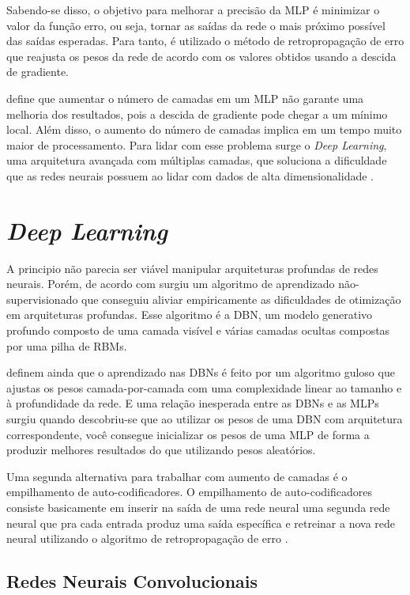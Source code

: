 Sabendo-se disso, o objetivo para melhorar a precisão da \ac{MLP} é minimizar o valor da função erro, ou seja, tornar as saídas da rede o mais próximo possível das saídas esperadas. Para tanto, é utilizado o método de retropropagação de erro que reajusta os pesos da rede de acordo com os valores obtidos usando a descida de gradiente.

 define que aumentar o número de camadas em um \ac{MLP} não garante uma melhoria dos resultados, pois a descida de gradiente pode chegar a um mínimo local. Além disso, o aumento do número de camadas implica em um tempo muito maior de processamento. Para lidar com esse problema surge o \emph{Deep Learning}, uma arquitetura avançada com múltiplas camadas, que soluciona a dificuldade que as redes neurais possuem ao lidar com dados de alta dimensionalidade \cite{arnold-2011}.

\section{\textit{Deep Learning}}
\label{secao:2:3}


A principio não parecia ser viável manipular arquiteturas profundas de redes neurais. Porém, de acordo com  surgiu um algoritmo de aprendizado não-supervisionado que conseguiu aliviar empiricamente as dificuldades de otimização em arquiteturas profundas. Esse algoritmo é a \ac{DBN}, um modelo generativo profundo composto de uma camada visível e várias camadas ocultas compostas por uma pilha de \ac{RBM}s.

 definem ainda que o aprendizado nas \ac{DBN}s é feito por um algoritmo guloso que ajustas os pesos camada-por-camada com uma complexidade linear ao tamanho e à profundidade da rede. E uma relação inesperada entre as \ac{DBN}s e as \ac{MLP}s surgiu quando descobriu-se que ao utilizar os pesos de uma \ac{DBN} com arquitetura correspondente, você consegue inicializar os pesos de uma \ac{MLP} de forma a produzir melhores resultados do que utilizando pesos aleatórios.

Uma segunda alternativa para trabalhar com aumento de camadas é o empilhamento de auto-codificadores. O empilhamento de auto-codificadores consiste basicamente em inserir na saída de uma rede neural uma segunda rede neural que pra cada entrada produz uma saída específica e retreinar a nova rede neural utilizando o algoritmo de retropropagação de erro \cite{deng-2014}.

\subsection{Redes Neurais Convolucionais}
\label{subsecao:2:3:1}


